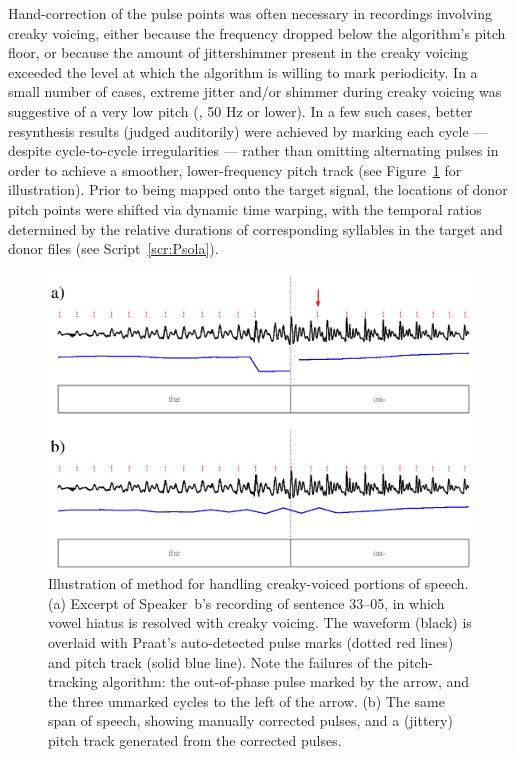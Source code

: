 Hand-correction of the pulse points was often necessary in recordings involving creaky voicing, either because the frequency dropped below the algorithm’s pitch floor, or because the amount of jitter\slsh{}shimmer present in the creaky voicing exceeded the level at which the algorithm is willing to mark periodicity.  In a small number of cases, extreme jitter and/or shimmer during creaky voicing was suggestive of a very low pitch (\ie, 50 Hz or lower).  In a few such cases, better resynthesis results (judged auditorily) were achieved by marking each cycle — despite cycle-to-cycle irregularities — rather than omitting alternating pulses in order to achieve a smoother, lower-frequency pitch track (see Figure~\ref{fig:JitShim} for illustration).  %
Prior to being mapped onto the target signal, the locations of donor pitch points were shifted via dynamic time warping, with the temporal ratios determined by the relative durations of corresponding syllables in the target and donor files (see Script~\ref{scr:Psola}).

\begin{figure}
	\begin{centering}
	\includegraphics{figures/creakJitterShimmer/creakJitterShimmer.eps}
	\caption[Handling of creaky voicing in resynthesis]{Illustration of method for handling creaky-voiced portions of speech.  (a) Excerpt of Speaker~\ac{b}’s recording of sentence 33–05, in which vowel hiatus is resolved with creaky voicing.  The waveform (black) is overlaid with Praat’s auto-detected pulse marks (dotted red lines) and pitch track (solid blue line).  Note the failures of the pitch-tracking algorithm: the out-of-phase pulse marked by the arrow, and the three unmarked cycles to the left of the arrow.  (b) The same span of speech, showing manually corrected pulses, and a (jittery) pitch track generated from the corrected pulses.\label{fig:JitShim}}
	\end{centering}
\end{figure}

